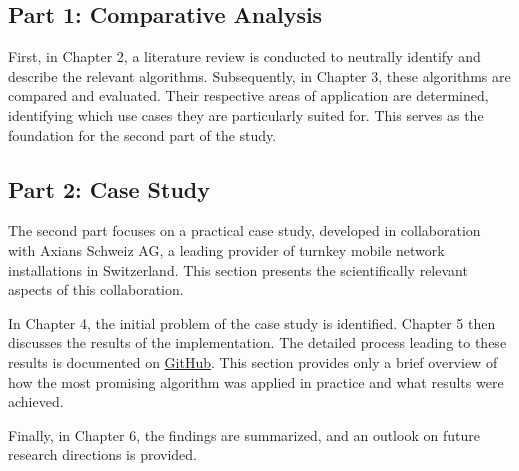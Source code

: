 \subsection{Part 1: Comparative Analysis}
\begin{comment}
Zunächst werden im kapitel 2 mit einer literaturanalyse die relevanten algorithmen wertneutral identifiziert und beschrieben. Anschliessend werden im kapitel 3 die algorithmen verglichen und bewertet. es werden anwendungsgebiete bestimmt, wofür sich die algorithmen besonders eignen. diese dient als grundlage für den zweiten teil.
\end{comment}
First, in Chapter 2, a literature review is conducted to neutrally identify and describe the relevant algorithms. Subsequently, in Chapter 3, these algorithms are compared and evaluated. Their respective areas of application are determined, identifying which use cases they are particularly suited for. This serves as the foundation for the second part of the study.


\subsection{Part 2: Case Study}
\begin{comment}
der zweite teil behandelt ein fallbeispiel aus der praxis und entstand in zusammenarbeit mit axians schweiz ag, einem führenden anbieter schlüsselfertiger mobilfunkanlagen der schweiz. dieser teil enthält den wissenschaftlich relevante teil dieser zusammenarbeit. in kapitel 4 wird zunächst das ausgangsproblem des fallbeispiels identifiziert. Im kapitel 5 wird anschliessend auf die resultate der implementierung eingegangen. der weg dahin wird auf \href{https://github.com/JeffreyLeisi/Scan-to-BIM-for-Telecom-Sites/tree/main/01-Report/tex}{GitHub} ausführlich beschrieben. hier soll lediglich kurz aufgezeigt werden, wie der erfolgsversprechendste algorithmus in der praxis angewendet wurde und welche ergebnisse erzielt wurden. abschliessend werden im kapitel 6 die ergebnisse zusammengefasst und ein ausblick auf zukünftige forschung gegeben.
\end{comment}
The second part focuses on a practical case study, developed in collaboration with Axians Schweiz AG, a leading provider of turnkey mobile network installations in Switzerland. This section presents the scientifically relevant aspects of this collaboration.

In Chapter 4, the initial problem of the case study is identified. Chapter 5 then discusses the results of the implementation. The detailed process leading to these results is documented on \href{https://github.com/JeffreyLeisi/Scan-to-BIM-for-Telecom-Sites/tree/main/01-Report/tex}{GitHub}. This section provides only a brief overview of how the most promising algorithm was applied in practice and what results were achieved.

Finally, in Chapter 6, the findings are summarized, and an outlook on future research directions is provided.